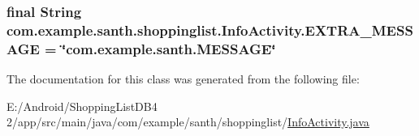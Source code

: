 \subsubsection[{\texorpdfstring{E\+X\+T\+R\+A\+\_\+\+M\+E\+S\+S\+A\+GE}{EXTRA_MESSAGE}}]{\setlength{\rightskip}{0pt plus 5cm}final String com.\+example.\+santh.\+shoppinglist.\+Info\+Activity.\+E\+X\+T\+R\+A\+\_\+\+M\+E\+S\+S\+A\+GE = \char`\"{}com.\+example.\+santh.\+M\+E\+S\+S\+A\+GE\char`\"{}\hspace{0.3cm}{\ttfamily [static]}}\hypertarget{classcom_1_1example_1_1santh_1_1shoppinglist_1_1_info_activity_afe9ca10f6ddfc92fa9d03b57077341aa}{}\label{classcom_1_1example_1_1santh_1_1shoppinglist_1_1_info_activity_afe9ca10f6ddfc92fa9d03b57077341aa}


The documentation for this class was generated from the following file\+:\begin{DoxyCompactItemize}
\item 
E\+:/\+Android/\+Shopping\+List\+D\+B4 2/app/src/main/java/com/example/santh/shoppinglist/\hyperlink{_info_activity_8java}{Info\+Activity.\+java}\end{DoxyCompactItemize}
